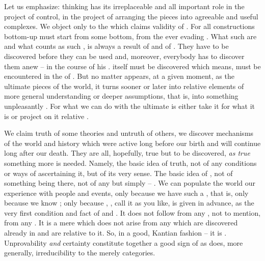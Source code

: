 \pa Let us emphasize:  thinking has its irreplaceable and all
important role in the project of control, in the project of 
arranging the  pieces into agreeable and useful complexes. We
object only to the  which claims 
validity of . For all constructions bottom-up must start from
some  bottom, from the ever evading . What such
 are and what counts as such , is always a result of
 and  of . They have
to be discovered before they can be used and, moreover, everybody has to
discover them anew -- in the course of his .  
itself must be discovered which means, must be encountered in the
 of .  But no matter  appears, at a
given moment, as the ultimate pieces of the  world, it turns
sooner or later into relative elements of more general understanding or deeper
assumptions, that is, into something unpleasantly . For what we
can do with the ultimate  is either take it for what it is or project
on it relative . 

We claim truth of some theories and untruth of others, we discover mechanisms of
the world and history which were active long before our birth and will continue
long after our death.  They are all, hopefully, true but to be discovered,
 {\em as true} something more is needed. Namely, the basic idea
of truth, not of any conditions or ways of ascertaining it, but of its very
sense. The basic idea of , not of something being there, not of
any  but simply -- . We can populate the world 
our experience with people and events, only because we have such a ,
that is, only because we know ; only because ,
, call it as you like, is given in advance, as the very first
condition and fact of
 and . %
It does not follow from any , not to mention, from any
. It is a mere  which does not arise from any
 which are discovered already in  and are relative to
it.  So, in a good, Kantian fashion -- it is .  Unprovability {\em
  and} certainty constitute together a good sign of  as does, more
generally, irreducibility to the merely  categories.


